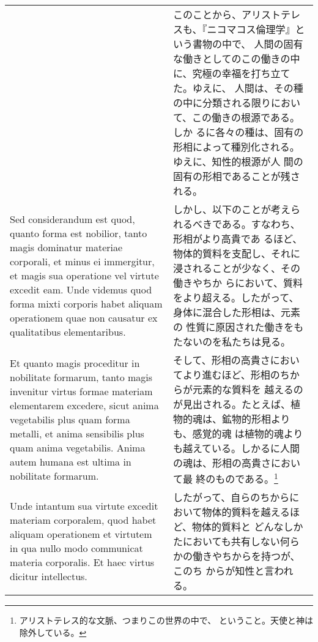 \documentclass[paper=a4paper,fontsize=10pt,jafontsize=9pt,titlepage]{jlreq}
\begin{document}
\begin{longtable}{p{21em}p{21em}}
&

このことから、アリストテレスも、『ニコマコス倫理学』という書物の中で、
人間の固有な働きとしてのこの働きの中に、究極の幸福を打ち立てた。ゆえに、
人間は、その種の中に分類される限りにおいて、この働きの根源である。しか
るに各々の種は、固有の形相によって種別化される。ゆえに、知性的根源が人
間の固有の形相であることが残される。
 
\\


 Sed considerandum est quod, quanto forma est nobilior, tanto magis
 dominatur materiae corporali, et minus ei immergitur, et magis sua
 operatione vel virtute excedit eam. Unde videmus quod forma mixti
 corporis habet aliquam operationem quae non causatur ex qualitatibus
 elementaribus.
 
&

しかし、以下のことが考えられるべきである。すなわち、形相がより高貴であ
るほど、物体的質料を支配し、それに浸されることが少なく、その働きやちか
らにおいて、質料をより超える。したがって、身体に混合した形相は、元素の
性質に原因された働きをもたないのを私たちは見る。
 
\\


 Et quanto magis proceditur in nobilitate formarum, tanto magis
 invenitur virtus formae materiam elementarem excedere, sicut anima
 vegetabilis plus quam forma metalli, et anima sensibilis plus quam
 anima vegetabilis. Anima autem humana est ultima in nobilitate
 formarum.
 
&

そして、形相の高貴さにおいてより進むほど、形相のちからが元素的な質料を
越えるのが見出される。たとえば、植物的魂は、鉱物的形相よりも、感覚的魂
は植物的魂よりも越えている。しかるに人間の魂は、形相の高貴さにおいて最
終のものである。\footnote{アリストテレス的な文脈、つまりこの世界の中で、
ということ。天使と神は除外している。}
 
\\


 Unde intantum sua virtute excedit materiam corporalem, quod habet
 aliquam operationem et virtutem in qua nullo modo communicat materia
 corporalis. Et haec virtus dicitur intellectus.
 
&

 したがって、自らのちからにおいて物体的質料を越えるほど、物体的質料と
 どんなしかたにおいても共有しない何らかの働きやちからを持つが、このち
 からが知性と言われる。
 
\\



\end{longtable}
\end{document}
